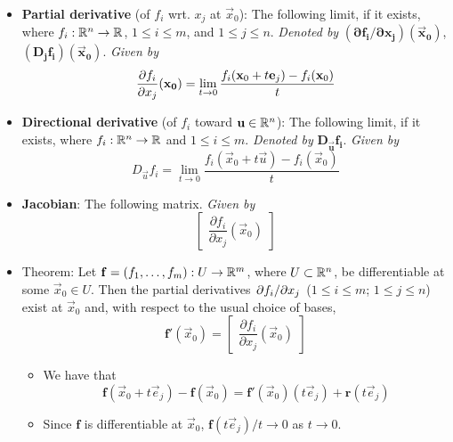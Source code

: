\documentclass[../notes.tex]{subfiles}
\begin{document}
\begin{itemize}
\begin{itemize}
    \end{itemize}
    \item \textbf{Partial derivative} (of $f_i$ wrt. $x_j$ at $\vec{x}_0$): The following limit, if it exists, where $f_i:\mathbb{R}^n\to\mathbb{R}$, $1\leq i\leq m$, and $1\leq j\leq n$. \emph{Denoted by} $\bm{(\partial f_i/\partial x_j)(\vec{x}_0)}$, $\bm{(D_jf_i)(\vec{x}_0)}$. \emph{Given by}
    \begin{equation*}
        {\pdv{f_i}{x_j}}(\mathbf{x_0}) = \lim_{t\to 0}\frac{f_i(\mathbf{x}_0+t\mathbf{e}_j)-f_i(\mathbf{x}_0)}{t}
    \end{equation*}
    \item \textbf{Directional derivative} (of $f_i$ toward $\mathbf{u}\in\mathbb{R}^n$): The following limit, if it exists, where $f_i:\mathbb{R}^n\to\mathbb{R}$ and $1\leq i\leq m$. \emph{Denoted by} $\bm{D_\vec{u}f_i}$. \emph{Given by}
    \begin{equation*}
        D_\vec{u}f_i = \lim_{t\to 0}\frac{f_i(\vec{x}_0+t\vec{u})-f_i(\vec{x}_0)}{t}
    \end{equation*}
    \item \textbf{Jacobian}: The following matrix. \emph{Given by}
    \begin{equation*}
        \begin{bmatrix}
            \dfrac{\partial f_i}{\partial x_j}(\vec{x}_0)
        \end{bmatrix}
    \end{equation*}
    \item Theorem: Let $\mathbf{f}=(f_1,\dots,f_m):U\to\mathbb{R}^m$, where $U\subset\mathbb{R}^n$, be differentiable at some $\vec{x}_0\in U$. Then the partial derivatives $\pdv*{f_i}{x_j}$ ($1\leq i\leq m$; $1\leq j\leq n$) exist at $\vec{x}_0$ and, with respect to the usual choice of bases,
    \begin{equation*}
        \mathbf{f}'(\vec{x}_0) =
        \begin{bmatrix}
            \dfrac{\partial f_i}{\partial x_j}(\vec{x}_0)
        \end{bmatrix}
    \end{equation*}
    \begin{itemize}
        \item {}We have that
        \begin{equation*}
            \mathbf{f}(\vec{x}_0+t\vec{e}_j)-\mathbf{f}(\vec{x}_0) = \mathbf{f}'(\vec{x}_0)(t\vec{e}_j)+\mathbf{r}(t\vec{e}_j)
        \end{equation*}
        \item Since $\mathbf{f}$ is differentiable at $\vec{x}_0$, $\mathbf{f}(t\vec{e}_j)/t\to 0$ as $t\to 0$.

\end{itemize}
\end{itemize}
\end{document}
